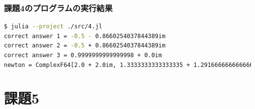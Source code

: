 \documentclass[uplatex, dvipdfmx, a4j,11pt]{jsarticle}
\begin{document}
\subsubsection*{課題4のプログラムの実行結果}
\begin{lstlisting}[title={課題3のプログラムの実行結果}, label=code:in, language=sh]
$ julia --project ./src/4.jl
correct answer 1 = -0.5 - 0.8660254037844389im
correct answer 2 = -0.5 + 0.8660254037844389im
correct answer 3 = 0.9999999999999998 + 0.0im
newton = ComplexF64[2.0 + 2.0im, 1.3333333333333335 + 1.2916666666666667im, 0.8919587643401641 + 0.7644343984868321im, 0.6316141948915452 + 0.27091503103632075im, 0.9074737442375064 - 0.3307184857335371im, 0.8785117198222385 + 0.009425064136978134im, 1.017425793612737 - 0.002981730242133532im, 1.000288456528848 - 0.00010043124551214772im, 1.000000073100373 - 5.790803531255297e-8im, 1.000000000000002 - 8.466196990699252e-15im]
\end{lstlisting}



\section*{課題5}
\end{document}

